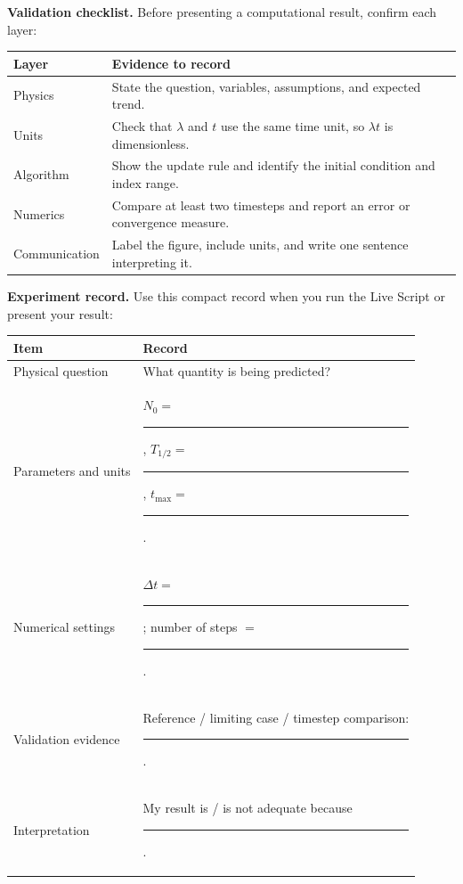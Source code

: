 \documentclass[11pt,a4paper]{article}
\begin{document}
\textbf{Validation checklist.} Before presenting a computational result, confirm each layer:
\begin{center}
\small
\begin{tabular}{>{\raggedright\arraybackslash}p{.23\linewidth}>{\raggedright\arraybackslash}p{.62\linewidth}}
\toprule
\textbf{Layer} & \textbf{Evidence to record}\\ \midrule
Physics & State the question, variables, assumptions, and expected trend.\\
Units & Check that $\lambda$ and $t$ use the same time unit, so $\lambda t$ is dimensionless.\\
Algorithm & Show the update rule and identify the initial condition and index range.\\
Numerics & Compare at least two timesteps and report an error or convergence measure.\\
Communication & Label the figure, include units, and write one sentence interpreting it.\\ \bottomrule
\end{tabular}
\end{center}

\textbf{Experiment record.} Use this compact record when you run the Live Script or present your result:
\begin{center}
\small
\begin{tabular}{>{\raggedright\arraybackslash}p{.27\linewidth}>{\raggedright\arraybackslash}p{.58\linewidth}}
\toprule
\textbf{Item} & \textbf{Record}\\ \midrule
Physical question & What quantity is being predicted?\\
Parameters and units & $N_0=$\rule{18mm}{0.3pt}, $T_{1/2}=$\rule{15mm}{0.3pt}, $t_{\max}=$\rule{15mm}{0.3pt}.\\
Numerical settings & $\Delta t=$\rule{15mm}{0.3pt}; number of steps $=$\rule{15mm}{0.3pt}.\\
Validation evidence & Reference / limiting case / timestep comparison: \rule{35mm}{0.3pt}.\\
Interpretation & My result is / is not adequate because \rule{28mm}{0.3pt}.\\ \bottomrule
\end{tabular}
\end{center}

\newpage
\end{document}
